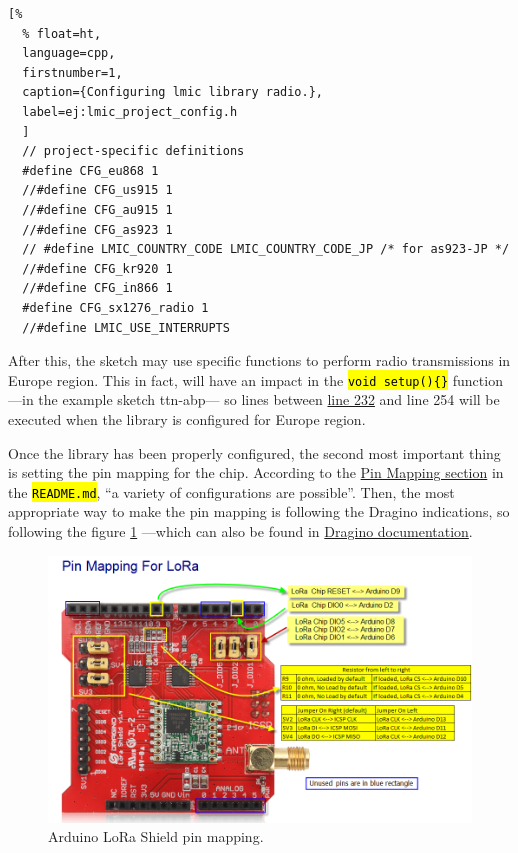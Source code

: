 \documentclass[11pt,a4paper,dvipsnames,twoside]{article}
\newcommand{\cmd}[1] {\hl{\texttt{#1}}}
\begin{document}
\begin{lstlisting}[%
  % float=ht,
  language=cpp,
  firstnumber=1,
  caption={Configuring lmic library radio.},
  label=ej:lmic_project_config.h
  ]
  // project-specific definitions
  #define CFG_eu868 1
  //#define CFG_us915 1
  //#define CFG_au915 1
  //#define CFG_as923 1
  // #define LMIC_COUNTRY_CODE LMIC_COUNTRY_CODE_JP	/* for as923-JP */
  //#define CFG_kr920 1
  //#define CFG_in866 1
  #define CFG_sx1276_radio 1
  //#define LMIC_USE_INTERRUPTS
\end{lstlisting}

After this, the sketch may use specific functions to perform radio transmissions in Europe region. This in fact, will have an impact in the \cmd{void setup()\{\}} function ---in the example sketch ttn-abp--- so lines between \href{https://github.com/mcci-catena/arduino-lmic/blob/master/examples/ttn-abp/ttn-abp.ino#L232}{line 232} and line 254 will be executed when the library is configured for Europe region.

Once the library has been properly configured, the second most important thing is setting the pin mapping for the chip. According to the \href{https://github.com/mcci-catena/arduino-lmic#pin-mapping}{Pin Mapping section} in the \cmd{README.md}, \enquote{a variety of configurations are possible}. Then, the most appropriate way to make the pin mapping is following the Dragino indications, so following the figure \ref{fig:Ard_LoRa_Shield_pin_mapping} ---which can also be found in \href{http://wiki.dragino.com/index.php?title=Lora_Shield#Pin_Mapping_and_Unused_Pins}{Dragino documentation}.

\begin{figure}[ht]
  \centering
  \includegraphics[width=.9\textwidth]{../pictures/LoRa_Shield_Pin_Mapping.png}
  \caption{Arduino LoRa Shield pin mapping.}
  \label{fig:Ard_LoRa_Shield_pin_mapping}
\end{figure}
\end{document}

